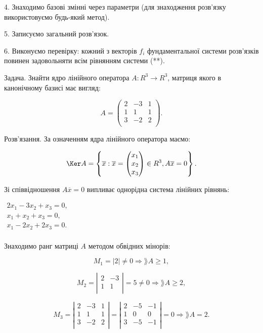 4. Знаходимо базові змінні через параметри (для знаходження розв’язку
використовуємо будь-який метод).

5. Записуємо загальний розв’язок. 

6. Виконуємо перевірку: кожний з векторів $f_i$ фундаментальної системи
розв’язків повинен задовольняти всім рівнянням системи (**).


Задача. Знайти ядро лінійного оператора $A: R^3 \rightarrow R^3$, матриця якого в
канонічному базисі має вигляд:

$$A = \begin{pmatrix}
	2 & -3 & 1 \\
	1 &  1 & 1 \\
	3 & -2 & 2 \\
\end{pmatrix}.$$



Розв’язання. За означенням ядра лінійного оператора маємо:

$$\Ker A = \left\{ \overline{x}: \overline{x} = \begin{pmatrix}
	x_1 \\
	x_2 \\
	x_3 \\
\end{pmatrix} \in R^3, A \overline{x} = 0 \right\}.$$

Зі співвідношення $A \overline{x} = 0$ випливає однорідна система лінійних рівнянь:

$\begin{matrix}
	2x_1 - 3x_2 + x_3 = 0, \\
	x_1 + x_2 + x_3 = 0, \\
	x_1 - 2x_2 + 2x_3 = 0. \\
\end{matrix}$

Знаходимо ранг матриці $A$ методом обвідних мінорів:

$$M_1 = |2| \neq 0 \Rightarrow \rang A \geqslant 1,$$

$$M_2 = \left| \begin{matrix}
	2 & -3 \\
	1 &  1 \\
\end{matrix} \right| = 5 \neq 0 \Rightarrow \rang A \geqslant 2,$$

$$M_3 = \left| \begin{matrix}
	2 & -3 & 1 \\
	1 &  1 & 1 \\
	3 & -2 & 2 \\
\end{matrix} \right| = \left| \begin{matrix}
	2 & -5 & -1 \\
	1 &  0 &  0 \\
	3 & -5 & -1 \\
\end{matrix} \right| = 0 \Rightarrow \rang A = 2.$$

